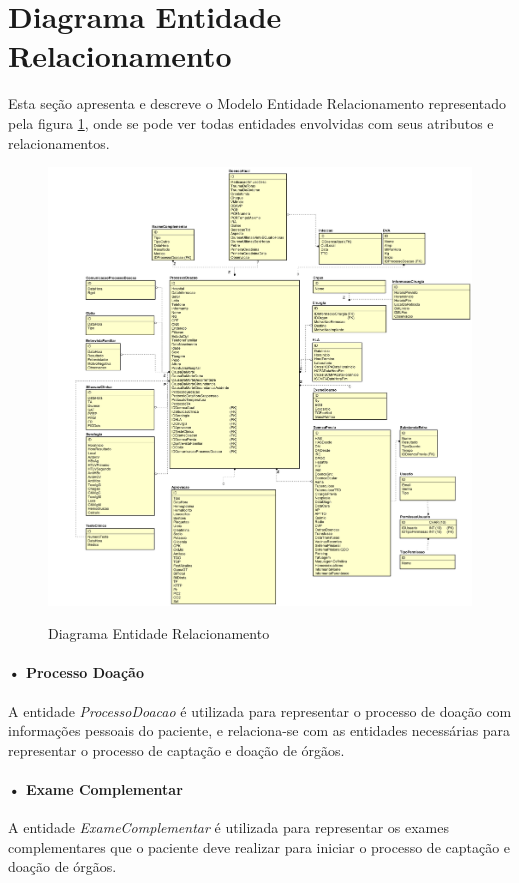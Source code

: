\documentclass[portuguese,oneside]{tcc}
\begin{document}
\section{Diagrama Entidade Relacionamento}
Esta seção apresenta e descreve o Modelo Entidade Relacionamento representado pela figura \ref{fig:erDiagram}, onde se pode ver todas entidades envolvidas com seus atributos e relacionamentos.

\begin{figure}[htp]
\centering
\caption{Diagrama Entidade Relacionamento}
\includegraphics[width=15cm]{er-diagram}
\label{fig:erDiagram}
\end{figure}

\newpage

\paragraph*{• Processo Doação}
A entidade \textit{ProcessoDoacao} é utilizada para representar o processo de doação com informações pessoais do paciente, e relaciona-se com as entidades necessárias para representar o processo de captação e doação de órgãos.

\paragraph*{• Exame Complementar}
A entidade \textit{ExameComplementar} é utilizada para representar os exames complementares que o paciente deve realizar para iniciar o processo de captação e doação de órgãos.
\end{document}
